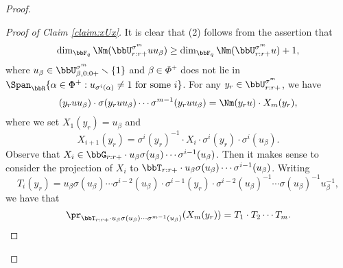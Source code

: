 \begin{proof}
\begin{proof}[Proof of Claim \ref{claim:xUx}]
    It is clear that (2) follows from the assertion that 
    \begin{equation}\label{eq:beta inequality}
      \dim_{\bbF_q} \Nm(\bbU_{r:r+}^{\sigma^m} u u_\beta) \geq \dim_{\bbF_q} \Nm(\bbU_{r:r+}^{\sigma^m} u) + 1,
    \end{equation}
    where $u_\beta \in \bbU_{\beta,0:0+}^{\sigma^m} \smallsetminus \{1\}$ and $\beta \in \Phi^+$ does not lie in $\Span_{\bbR}\{\alpha \in \Phi^+ : \text{$u_{\sigma^i(\alpha)} \neq 1$ for some $i$}\}$. For any $y_r \in \bbU_{r:r+}^{\sigma^m}$, we have
    \begin{align*}
      (y_r u u_\beta) \cdot \sigma(y_r u u_\beta) \cdots \sigma^{m-1}(y_r u u_\beta) = \Nm(y_r u) \cdot X_m(y_r),
    \end{align*}
    where we set $X_1(y_r) = u_\beta$ and
    \begin{equation*}
      X_{i+1}(y_r) = \sigma^i(y_r)^{-1} \cdot X_i \cdot \sigma^i(y_r) \cdot \sigma^i(u_\beta).
    \end{equation*}
    Observe that $X_i \in \bbG_{r:r+} \cdot u_\beta \sigma(u_\beta) \cdots \sigma^{i-1}(u_\beta)$. Then it makes sense to consider the projection of $X_i$ to $\bbT_{r:r+} \cdot u_\beta \sigma(u_\beta) \cdots \sigma^{i-1}(u_\beta)$. Writing
    \begin{equation*}
      T_i(y_r) = u_\beta \sigma(u_\beta) \cdots \sigma^{i-2}(u_\beta) \cdot \sigma^{i-1}(y_r) \cdot \sigma^{i-2}(u_\beta)^{-1} \cdots \sigma(u_\beta)^{-1} u_\beta^{-1}, 
    \end{equation*}
    we have that
    \begin{equation*}
      \pr_{\bbT_{r:r+} \cdot u_\beta \sigma(u_\beta) \cdots \sigma^{m-1}(u_\beta)}(X_m(y_r)) = T_1 \cdot T_2 \cdots T_m.
    \end{equation*}


\end{proof}
\end{proof}
